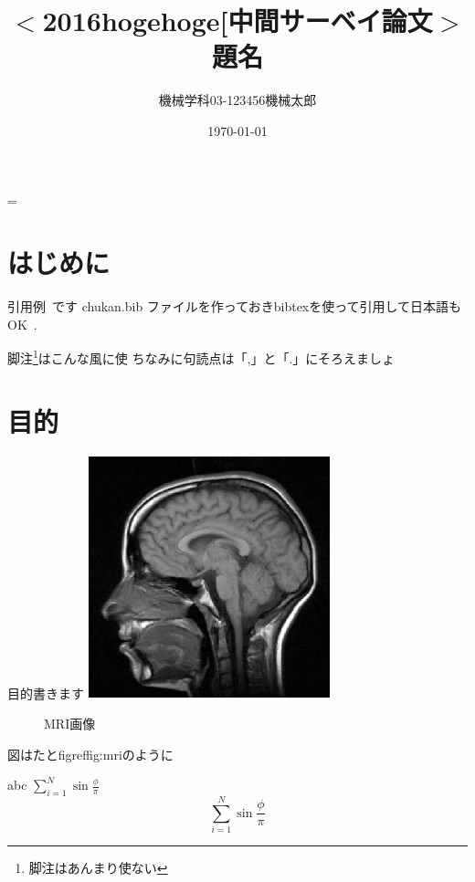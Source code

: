\documentclass[a4j, twocolumn, 8pt,pdflatex,jadriver=standard]{bxjsarticle}
\title{{\small $<$2016hogehoge[中間サーベイ論文$>$}\\
       {\Large 題名}\vspace{-4mm}}
\author{{\normalsize 機械学科03-123456機械太郎}\vspace{-4mm}}
\date{\small \today}
\makeatletter
\renewcommand\maketitle{
  \ifnum \col@number=\@ne \@maketitle
  \else \twocolumn[
    \vspace{-16mm}
    \@maketitle
  ]
  \fi
 }
\makeatother
\begin{document}
\maketitle \thispagestyle{empty}
\normalsize
\vspace{-8mm}


\section{はじめに}
\vspace{-3mm}

引用例~\cite{Brooks1991:Intelligence_Without_Reason}です
chukan.bib ファイルを作っておきbibtexを使って引用して日本語もOK~\cite{book:Pfeifer:知の創成}.

脚注\footnote{脚注はあんまり使ない}はこんな風に使
ちなみに句読点は「,」と「.」にそろえましょ
\section{目的}
\vspace{-3mm}
目的書きます
 \includegraphics[width=7cm,clip]{./figure/map.eps}
\begin{figure}[htbp]
 \begin{center}
 \caption{MRI画像}
 \label{fig:mri}
 \end{center}
\end{figure}

\vspace{-9mm}
図はたとfigref{fig:mri}のように

abc $ \sum_{i=1}^N \sin \frac{\phi}{\pi}$
\begin{equation}
 \sum_{i=1}^N \sin \frac{\phi}{\pi}
\end{equation}

\vspace{-6mm}
\end{document}
